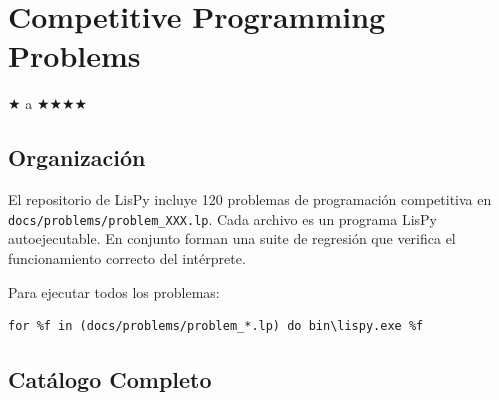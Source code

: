 \chapter{Competitive Programming Problems}
\label{chap:cpproblems}
{\huge$\bigstar$} a {\huge$\bigstar$}{\huge$\bigstar$}{\huge$\bigstar$}{\huge$\bigstar$}

\section{Organización}

El repositorio de LisPy incluye 120 problemas de programación competitiva
en \texttt{docs/problems/problem\_XXX.lp}. Cada archivo es un programa
LisPy autoejecutable. En conjunto forman una suite de regresión que verifica
el funcionamiento correcto del intérprete.

Para ejecutar todos los problemas:

\begin{lstlisting}[style=python,title=Terminal]
for %f in (docs/problems/problem_*.lp) do bin\lispy.exe %f
\end{lstlisting}

\section{Catálogo Completo}

